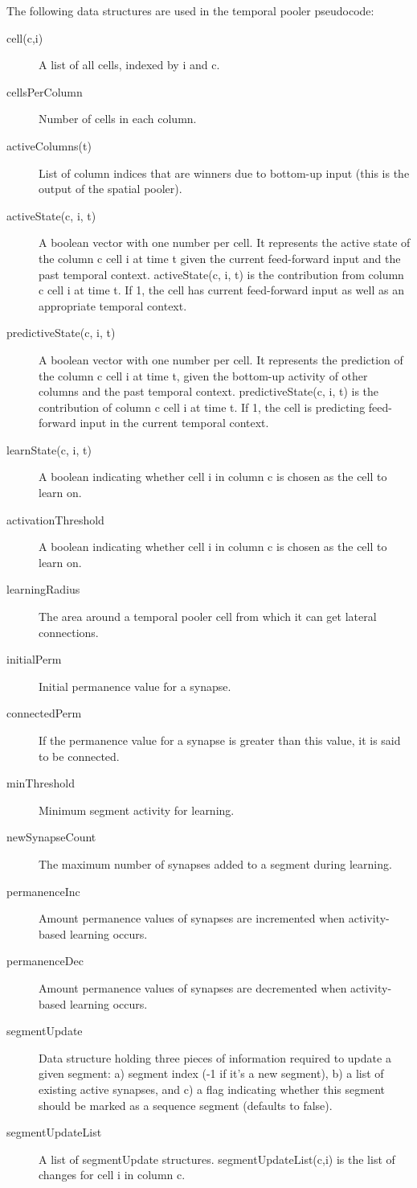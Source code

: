 \documentclass{report}
\begin{document}
The following data structures are used in the temporal pooler pseudocode:

\begin{description}
\item[cell(c,i)] A list of all cells, indexed by i and c.
\item[cellsPerColumn] Number of cells in each column.
\item[activeColumns(t)] List of column indices that are winners due to
  bottom-up input (this is the output of the spatial pooler).
\item[activeState(c, i, t)] A boolean vector with one number per
  cell. It represents the active state of the column c cell i at time
  t given the current feed-forward input and the past temporal
  context. activeState(c, i, t) is the contribution from column c cell
  i at time t. If 1, the cell has current feed-forward input as well
  as an appropriate temporal context.
\item[predictiveState(c, i, t)] A boolean vector with one number per
  cell. It represents the prediction of the column c cell i at time t,
  given the bottom-up activity of other columns and the past temporal
  context. predictiveState(c, i, t) is the contribution of column c
  cell i at time t. If 1, the cell is predicting feed-forward input in
  the current temporal context.
\item[learnState(c, i, t)] A boolean indicating whether cell i in
  column c is chosen as the cell to learn on.
\item[activationThreshold] A boolean indicating whether cell i in
  column c is chosen as the cell to learn on.
\item[learningRadius] The area around a temporal pooler cell from
  which it can get lateral connections.
\item[initialPerm] Initial permanence value for a synapse.
\item[connectedPerm] If the permanence value for a synapse is greater
  than this value, it is said to be connected.
\item[minThreshold] Minimum segment activity for learning.
\item[newSynapseCount] The maximum number of synapses added to a
  segment during learning.
\item[permanenceInc] Amount permanence values of synapses are
  incremented when activity-based learning occurs.
\item[permanenceDec] Amount permanence values of synapses are
  decremented when activity-based learning occurs.
\item[segmentUpdate] Data structure holding three pieces of
  information required to update a given segment: a) segment index (-1
  if it's a new segment), b) a list of existing active synapses, and
  c) a flag indicating whether this segment should be marked as a
  sequence segment (defaults to false).
\item[segmentUpdateList] A list of segmentUpdate
  structures. segmentUpdateList(c,i) is the list of changes for cell i
  in column c.
\end{description}
\end{document}
